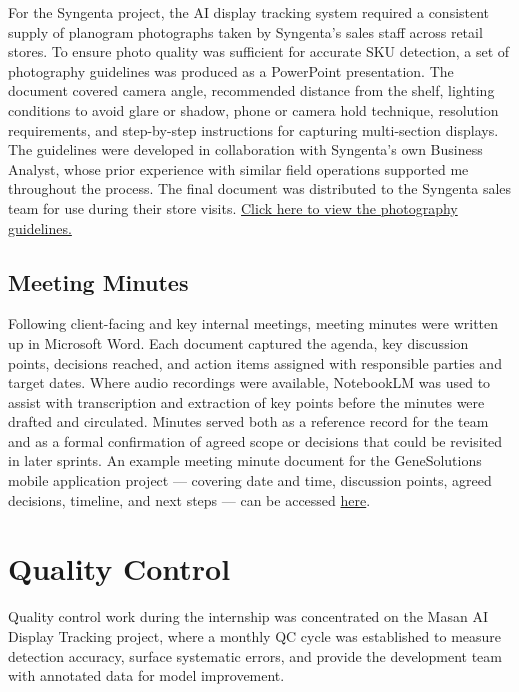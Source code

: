 For the Syngenta project, the AI display tracking system required a consistent supply of planogram photographs taken by Syngenta's sales staff across retail stores. To ensure photo quality was sufficient for accurate SKU detection, a set of photography guidelines was produced as a PowerPoint presentation. The document covered camera angle, recommended distance from the shelf, lighting conditions to avoid glare or shadow, phone or camera hold technique, resolution requirements, and step-by-step instructions for capturing multi-section displays. The guidelines were developed in collaboration with Syngenta's own Business Analyst, whose prior experience with similar field operations supported me throughout the process. The final document was distributed to the Syngenta sales team for use during their store visits. \href{https://docs.google.com/presentation/d/1EplZqxE6QRnJwkoFSmOROBI-ZgtiMAWhaVwrPOwTQXU/edit?usp=sharing}{Click here to view the photography guidelines.}

\subsection{Meeting Minutes}

Following client-facing and key internal meetings, meeting minutes were written up in Microsoft Word. Each document captured the agenda, key discussion points, decisions reached, and action items assigned with responsible parties and target dates. Where audio recordings were available, NotebookLM was used to assist with transcription and extraction of key points before the minutes were drafted and circulated. Minutes served both as a reference record for the team and as a formal confirmation of agreed scope or decisions that could be revisited in later sprints. An example meeting minute document for the GeneSolutions mobile application project — covering date and time, discussion points, agreed decisions, timeline, and next steps — can be accessed \href{https://docs.google.com/document/d/1shnJYx8qj8C8NVCS9QnvWluF2xeUx23HgERFKZov9Xs/edit?usp=drive_link}{here}.

\section{Quality Control}

Quality control work during the internship was concentrated on the Masan AI Display Tracking project, where a monthly QC cycle was established to measure detection accuracy, surface systematic errors, and provide the development team with annotated data for model improvement.


